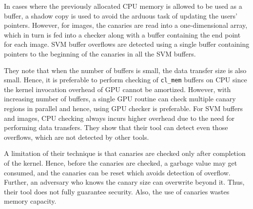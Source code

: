 In cases where the previously allocated CPU memory is allowed to be used as a buffer, a shadow copy is used to avoid the arduous task of updating the users' pointers. However, for images, the canaries are read into a one-dimensional array, which in turn is fed into a checker along with a buffer containing the end point for each image. SVM buffer overflows are detected using a single buffer containing pointers to the beginning of the canaries in all the SVM buffers.

They note that when the number of buffers is small, the data transfer size is also small. Hence, it is preferable to perform checking of {\tt cl\_mem} buffers on CPU since the kernel invocation overhead of GPU cannot be amortized. However, with increasing number of buffers, a single GPU routine can check multiple canary regions in parallel and hence, using GPU checker is preferable. For SVM buffers and images, CPU checking always incurs higher overhead due to the need for performing data transfers. They show that their tool can detect even those overflows, which are not detected by other tools.  

A limitation of their technique is that canaries are checked only after completion of the kernel.  Hence, before the canaries are checked, a garbage value may get consumed, and the canaries can be reset which avoids detection of overflow.  Further, an adversary who knows the canary size can overwrite beyond it.  Thus, their tool does not fully guarantee security. Also, the use of canaries wastes memory capacity.

  


 


  


